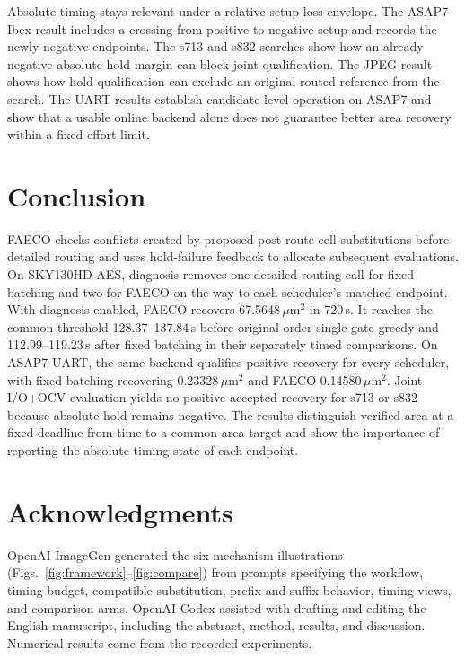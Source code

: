\documentclass[journal]{IEEEtran}
\newcommand{\um}{\ensuremath{\mu\mathrm{m}^{2}}}
\begin{document}
Absolute timing stays relevant under a relative setup-loss envelope. The ASAP7 Ibex result includes a crossing from positive to negative setup and records the newly negative endpoints. The s713 and s832 searches show how an already negative absolute hold margin can block joint qualification. The JPEG result shows how hold qualification can exclude an original routed reference from the search. The UART results establish candidate-level operation on ASAP7 and show that a usable online backend alone does not guarantee better area recovery within a fixed effort limit.

\balance
\section{Conclusion}

FAECO checks conflicts created by proposed post-route cell substitutions before detailed routing and uses hold-failure feedback to allocate subsequent evaluations. On SKY130HD AES, diagnosis removes one detailed-routing call for fixed batching and two for FAECO on the way to each scheduler's matched endpoint. With diagnosis enabled, FAECO recovers 67.5648\,\um{} in 720\,s. It reaches the common threshold 128.37--137.84\,s before original-order single-gate greedy and 112.99--119.23\,s after fixed batching in their separately timed comparisons. On ASAP7 UART, the same backend qualifies positive recovery for every scheduler, with fixed batching recovering 0.23328\,\um{} and FAECO 0.14580\,\um. Joint I/O+OCV evaluation yields no positive accepted recovery for s713 or s832 because absolute hold remains negative. The results distinguish verified area at a fixed deadline from time to a common area target and show the importance of reporting the absolute timing state of each endpoint.

\section*{Acknowledgments}

OpenAI ImageGen generated the six mechanism illustrations (Figs.~\ref{fig:framework}--\ref{fig:compare}) from prompts specifying the workflow, timing budget, compatible substitution, prefix and suffix behavior, timing views, and comparison arms. OpenAI Codex assisted with drafting and editing the English manuscript, including the abstract, method, results, and discussion. Numerical results come from the recorded experiments.
\end{document}
